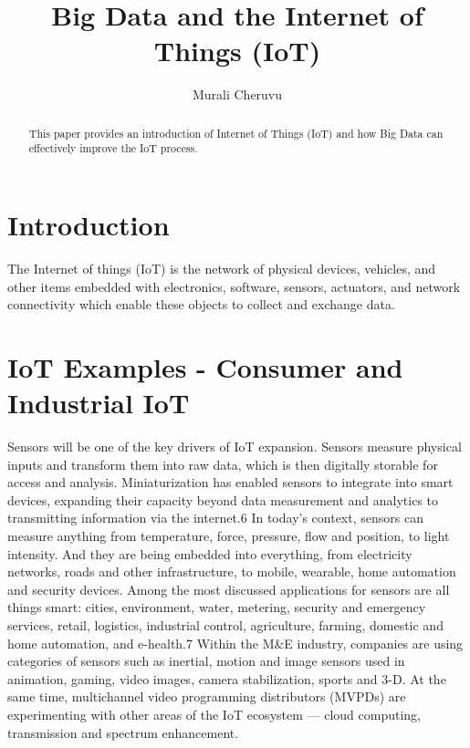 \documentclass[sigconf]{acmart}
\begin{document}
\title{Big Data and the Internet of Things (IoT)}


\author{Murali Cheruvu}

\renewcommand{\shortauthors}{B. Trovato et al.}


\begin{abstract}
This paper provides an introduction of Internet of Things (IoT) and how Big Data can effectively improve the IoT process.
\end{abstract}



\maketitle

\section{Introduction}

The Internet of things (IoT) is the network of physical devices, vehicles, and other items embedded with electronics, software, sensors, actuators, and network connectivity which enable these objects to collect and exchange data.

\section{IoT Examples - Consumer and Industrial IoT}

Sensors will be one of the key drivers of IoT expansion. Sensors measure physical inputs and transform them into raw data, which is then digitally storable for access and analysis. Miniaturization has enabled sensors to integrate into smart devices, expanding their capacity beyond data measurement and analytics to transmitting information via the internet.6 In today’s context, sensors can measure anything from temperature, force, pressure, flow and position, to light intensity. And they are being embedded into everything, from
electricity networks, roads and other infrastructure, to mobile, wearable, home automation and security devices.
Among the most discussed applications for sensors are all things smart: cities, environment, water, metering, security and emergency services, retail, logistics, industrial control, agriculture, farming, domestic and home automation, and e-health.7 Within the M&E industry, companies are using categories of sensors such as inertial, motion and image sensors used in animation, gaming, video images, camera stabilization, sports and 3-D. At the same time, multichannel video programming distributors (MVPDs) are experimenting with other areas of the IoT ecosystem — cloud computing, transmission and spectrum enhancement.
\end{document}

